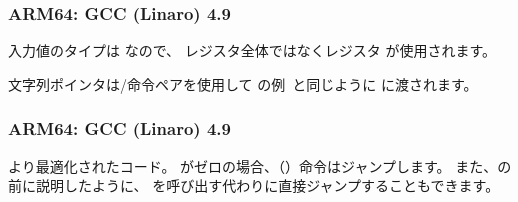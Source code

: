 \subsubsection{ARM64: \NonOptimizing GCC (Linaro) 4.9}



入力値のタイプは \Tint なので、  レジスタ全体ではなくレジスタ  が使用されます。

文字列ポインタは/命令ペアを使用して\q{\HelloWorldSectionName}
の例~と同じように \puts に渡されます。

\subsubsection{ARM64: \Optimizing GCC (Linaro) 4.9}



より最適化されたコード。
がゼロの場合、（）命令はジャンプします。
また、の前に説明したように、 \puts を呼び出す代わりに直接ジャンプすることもできます。
